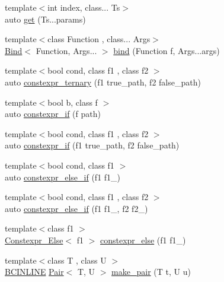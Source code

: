 \begin{DoxyCompactItemize}
\item 
{\footnotesize template$<$int index, class... Ts$>$ }\\auto \hyperlink{namespaceBC_1_1meta_a1f88be855b2fc0990694e93b0cd429ca}{get} (Ts...\+params)
\item 
{\footnotesize template$<$class Function , class... Args$>$ }\\\hyperlink{structBC_1_1meta_1_1Bind}{Bind}$<$ Function, Args... $>$ \hyperlink{namespaceBC_1_1meta_a945d90a91ccd59ed706041a048cd8df1}{bind} (Function f, Args...\+args)
\item 
{\footnotesize template$<$bool cond, class f1 , class f2 $>$ }\\auto \hyperlink{namespaceBC_1_1meta_a209dc926cef76a430de0fb1c52f2d28d}{constexpr\+\_\+ternary} (f1 true\+\_\+path, f2 false\+\_\+path)
\item 
{\footnotesize template$<$bool b, class f $>$ }\\auto \hyperlink{namespaceBC_1_1meta_a2fd3d5755398360b88ef69b886f7d144}{constexpr\+\_\+if} (f path)
\item 
{\footnotesize template$<$bool cond, class f1 , class f2 $>$ }\\auto \hyperlink{namespaceBC_1_1meta_a39d2f5624161f998372cd9e98031f8fb}{constexpr\+\_\+if} (f1 true\+\_\+path, f2 false\+\_\+path)
\item 
{\footnotesize template$<$bool cond, class f1 $>$ }\\auto \hyperlink{namespaceBC_1_1meta_ad8bd175962b1c0e27c6d679dec431e2f}{constexpr\+\_\+else\+\_\+if} (f1 f1\+\_\+)
\item 
{\footnotesize template$<$bool cond, class f1 , class f2 $>$ }\\auto \hyperlink{namespaceBC_1_1meta_acb13b45e0c687e983ea553be368a614b}{constexpr\+\_\+else\+\_\+if} (f1 f1\+\_\+, f2 f2\+\_\+)
\item 
{\footnotesize template$<$class f1 $>$ }\\\hyperlink{structBC_1_1meta_1_1Constexpr__Else}{Constexpr\+\_\+\+Else}$<$ f1 $>$ \hyperlink{namespaceBC_1_1meta_aed37053e9740d1bef8fb5b02027ff56b}{constexpr\+\_\+else} (f1 f1\+\_\+)
\item 
{\footnotesize template$<$class T , class U $>$ }\\\hyperlink{BlackCat__Common_8h_a6699e8b0449da5c0fafb878e59c1d4b1}{B\+C\+I\+N\+L\+I\+NE} \hyperlink{structBC_1_1meta_1_1Pair}{Pair}$<$ T, U $>$ \hyperlink{namespaceBC_1_1meta_a0a584bcba161b6465fc970e40bd697ec}{make\+\_\+pair} (T t, U u)

\end{DoxyCompactItemize}
